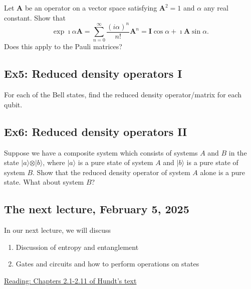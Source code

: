 Let $\bm{A}$ be an operator on a vector space satisfying $\bm{A}^2=1$ and $\alpha$ any real constant. Show that
\[
\exp{\imath\alpha \bm{A}}=\sum_{n=0}^{\infty} \frac{(i\alpha)^n}{n!}\bm{A}^n=\bm{I}\cos{\alpha}+\imath\bm{A}\sin{\alpha}.
\]
Does this apply to the Pauli matrices?

\subsection{Ex5: Reduced density operators I}

For each of the Bell states, find the reduced density operator/matrix for each qubit.

\subsection{Ex6: Reduced density operators II}

Suppose we have a composite system which consists of systems $A$ and
$B$ in the state $\vert a\rangle \otimes \vert b\rangle$, where $\vert
a\rangle $ is a pure state of system $A$ and $\vert b\rangle$ is a
pure state of system $B$. Show that the reduced density operator of
system $A$ alone is a pure state. What about system $B$?

\subsection{The next lecture, February 5, 2025}

In our next lecture, we will discuss
\begin{enumerate}
\item Discussion of entropy and entanglement

\item Gates and circuits and how to perform operations on states
\end{enumerate}

\noindent
\href{{https://github.com/CompPhysics/QuantumComputingMachineLearning/blob/gh-pages/doc/Textbooks/Programming/chapter2.pdf}}{Reading: Chapters 2.1-2.11 of Hundt's text}

